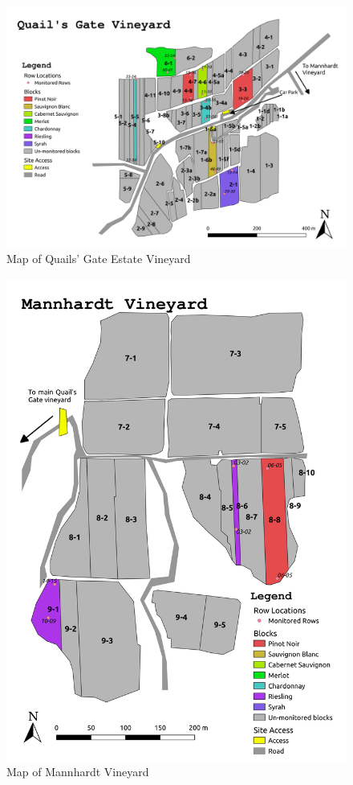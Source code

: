 \documentclass[11pt,letter]{article}
\begin{document}
\begin{figure} [h]
   \includegraphics[width = \linewidth]{QG_Map.jpg}
  \caption{Map of Quails' Gate Estate Vineyard}
  \label{fig:QGmap}
\end{figure}

\begin{figure} [h]
   \includegraphics[width = \linewidth]{MA_Map.jpg}
  \caption{Map of Mannhardt Vineyard}
  \label{fig:MAmap}
\end{figure}
\end{document}
